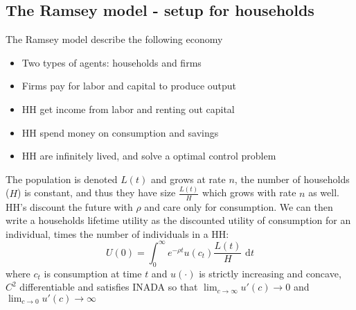 \documentclass[12pt, a4paper]{article}
\begin{document}
\begin{spacing}{1.213}


\subsection{The Ramsey model - setup for households}
The Ramsey model describe the following economy
\begin{itemize}
\item Two types of agents: households and firms
\item Firms pay for labor and capital to produce output
\item HH get income from labor and renting out capital
\item HH spend money on consumption and savings
\item HH are infinitely lived, and solve a optimal control problem
\end{itemize}

The population is denoted $L(t)$ and grows at rate $n$, the number of households ($H$) is constant, and thus they have size $\frac{L(t)}{H}$ which grows with rate $n$ as well. HH's discount the future with $\rho$ and care only for consumption. We can then write a households lifetime utility as the discounted utility of consumption for an individual, times the number of individuals in a HH:
\begin{equation}
U(0) = \int_0^{\infty} e^{-\rho t} u(c_t) \frac{L(t)}{H} \textrm{ d}t
\end{equation}
where $c_t$ is consumption at time $t$ and $u(\cdot)$ is strictly increasing and concave, $C^2$ differentiable and satisfies INADA so that $\lim_{c \rightarrow \infty} u'(c) \rightarrow 0$ and $\lim_{c \rightarrow 0} u'(c) \rightarrow \infty$


\end{spacing}
\end{document}
